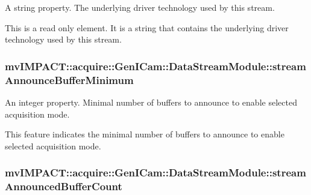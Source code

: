 A string property. The underlying driver technology used by this stream. 

This is a read only element. It is a string that contains the underlying driver technology used by this stream. \hypertarget{classmv_i_m_p_a_c_t_1_1acquire_1_1_gen_i_cam_1_1_data_stream_module_a3a218f6e6062c463b6eaaf53da37af58}{
\subsubsection[{stream\+Announce\+Buffer\+Minimum}]{ mv\+I\+M\+P\+A\+C\+T\+::acquire\+::\+Gen\+I\+Cam\+::\+Data\+Stream\+Module\+::stream\+Announce\+Buffer\+Minimum}}\label{classmv_i_m_p_a_c_t_1_1acquire_1_1_gen_i_cam_1_1_data_stream_module_a3a218f6e6062c463b6eaaf53da37af58}


An integer property. Minimal number of buffers to announce to enable selected acquisition mode. 

This feature indicates the minimal number of buffers to announce to enable selected acquisition mode. \hypertarget{classmv_i_m_p_a_c_t_1_1acquire_1_1_gen_i_cam_1_1_data_stream_module_a2201f31acb5ff5b785d8a746cda383de}{
\subsubsection[{stream\+Announced\+Buffer\+Count}]{ mv\+I\+M\+P\+A\+C\+T\+::acquire\+::\+Gen\+I\+Cam\+::\+Data\+Stream\+Module\+::stream\+Announced\+Buffer\+Count}}\label{classmv_i_m_p_a_c_t_1_1acquire_1_1_gen_i_cam_1_1_data_stream_module_a2201f31acb5ff5b785d8a746cda383de}


